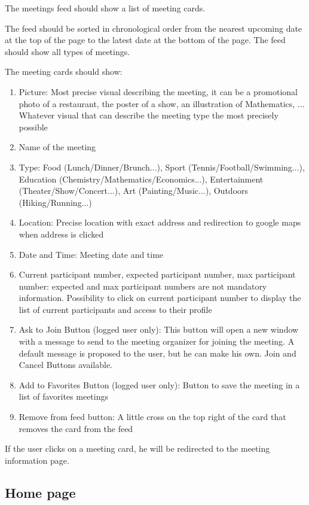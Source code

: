 \documentclass[conference]{IEEEtran}
\begin{document}
The meetings feed should show a list of meeting cards. 

The feed should be sorted in chronological order from the nearest upcoming date at the top of the page to the latest date at the bottom of the page. 
The feed should show all types of meetings.

The meeting cards should show:

\begin{enumerate}
    \item Picture: Most precise visual describing the meeting, it can be a promotional photo of a restaurant, the poster of a show, an illustration of Mathematics, ... Whatever visual that can describe the meeting type the most precisely possible
    \item Name of the meeting
    \item Type: Food (Lunch/Dinner/Brunch...), Sport (Tennis/Football/Swimming...), Education (Chemistry/Mathematics/Economics...), Entertainment (Theater/Show/Concert...), Art (Painting/Music...), Outdoors (Hiking/Running...)
    \item Location: Precise location with exact address and redirection to google maps when address is clicked
    \item Date and Time: Meeting date and time
    \item Current participant number, expected participant number, max participant number: expected and max participant numbers are not mandatory information. 
    Possibility to click on current participant number to display the list of current participants and access to their profile
    \item Ask to Join Button (logged user only): This button will open a new window with a message to send to the meeting organizer for joining the meeting. 
    A default message is proposed to the user, but he can make his own. 
    Join and Cancel Buttons available.
    \item Add to Favorites Button (logged user only): Button to save the meeting in a list of favorites meetings
    \item Remove from feed button: A little cross on the top right of the card that removes the card from the feed
\end{enumerate}

If the user clicks on a meeting card, he will be redirected to the meeting information page.

\subsection{Home page}
\end{document}
